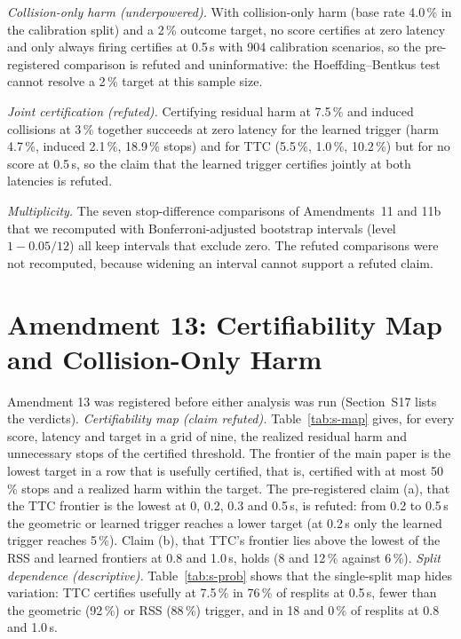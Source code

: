 \documentclass[lettersize,journal]{IEEEtran}
\begin{document}
\emph{Collision-only harm (underpowered).} With collision-only harm (base rate
4.0\,\% in the calibration split) and a 2\,\% outcome target, no score certifies at
zero latency and only always firing certifies at 0.5\,s with 904 calibration
scenarios, so the pre-registered comparison is refuted and uninformative:
the Hoeffding--Bentkus test cannot resolve a 2\,\% target at this sample size.

\emph{Joint certification (refuted).} Certifying residual harm at 7.5\,\% and
induced collisions at 3\,\% together succeeds at zero latency for the learned
trigger (harm 4.7\,\%, induced 2.1\,\%, 18.9\,\% stops) and for TTC (5.5\,\%, 1.0\,\%,
10.2\,\%) but for no score at 0.5\,s, so the claim that the learned trigger
certifies jointly at both latencies is refuted.

\emph{Multiplicity.} The seven stop-difference comparisons of Amendments~11 and
11b that we recomputed with Bonferroni-adjusted bootstrap intervals (level
$1-0.05/12$) all keep intervals that exclude zero. The refuted comparisons
were not recomputed, because widening an interval cannot support a
refuted claim.

\section{Amendment 13: Certifiability Map and Collision-Only Harm}
\label{sec:s-a13}
Amendment 13 was registered before either analysis was run (Section~S17 lists the verdicts). \emph{Certifiability map (claim refuted).} Table~\ref{tab:s-map} gives, for every score, latency and target in a grid of nine, the realized residual harm and unnecessary stops of the certified threshold. The frontier of the main paper is the lowest target in a row that is usefully certified, that is, certified with at most 50\,\% stops and a realized harm within the target. The pre-registered claim (a), that the TTC frontier is the lowest at 0, 0.2, 0.3 and 0.5\,s, is refuted: from 0.2 to 0.5\,s the geometric or learned trigger reaches a lower target (at 0.2\,s only the learned trigger reaches 5\,\%). Claim (b), that TTC's frontier lies above the lowest of the RSS and learned frontiers at 0.8 and 1.0\,s, holds (8 and 12\,\% against 6\,\%). \emph{Split dependence (descriptive).} Table~\ref{tab:s-prob} shows that the single-split map hides variation: TTC certifies usefully at 7.5\,\% in 76\,\% of resplits at 0.5\,s, fewer than the geometric (92\,\%) or RSS (88\,\%) trigger, and in 18 and 0\,\% of resplits at 0.8 and 1.0\,s.
\end{document}
